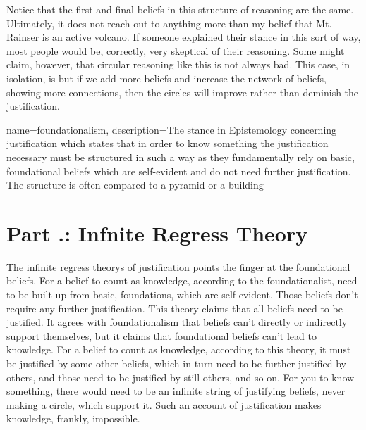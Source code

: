 
Notice that the first and final beliefs in this structure of reasoning are the same. Ultimately, it does not reach out to anything more than my belief that Mt. Rainser is an active volcano. If someone explained their stance in this sort of way, most people would be, correctly, very skeptical of their reasoning. Some might claim, however, that circular reasoning like this is not always bad. This case, in isolation, is but if we add more beliefs and increase the network of beliefs, showing more connections, then the circles will improve rather than deminish the justification. 

{
name=foundationalism,
description={The stance in Epistemology concerning justification which states that in order to know something the justification necessary must be structured in such a way as they fundamentally rely on basic, foundational beliefs which are self-evident and do not need further justification. The structure is often compared to a pyramid or a building}
}


\section{Part \thechapcount.\theseccount: Infnite Regress Theory}

The \glspl{infinite regress theory} of justification points the finger at the foundational beliefs. For a belief to count as knowledge, according to the foundationalist, need to be built up from basic, foundations, which are self-evident. Those beliefs don't require any further justification. This theory claims that all beliefs need to be justified. It agrees with foundationalism that beliefs can't directly or indirectly support themselves, but it claims that foundational beliefs can't lead to knowledge. For a belief to count as knowledge, according to this theory, it must be justified by some other beliefs, which in turn need to be further justified by others, and those need to be justified by still others, and so on. For you to know something, there would need to be an infinite string of justifying beliefs, never making a circle, which support it. Such an account of justification makes knowledge, frankly, impossible.


